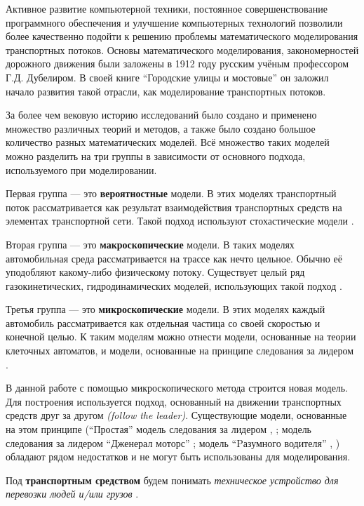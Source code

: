 \documentclass[12pt, a4paper]{extarticle}
\numberwithin{equation}{section}
\numberwithin{figure}{section}
\begin{document}
Активное развитие компьютерной техники, постоянное совершенствование программного обеспечения и улучшение компьютерных технологий позволили более качественно подойти к решению проблемы математического моделирования транспортных потоков. Основы математического моделирования, закономерностей дорожного движения были заложены в 1912 году русским учёным профессором Г.Д. Дубелиром. В своей книге ``Городские улицы и мостовые'' \cite{Street} он заложил начало развития такой отрасли, как моделирование транспортных потоков.

За более чем вековую историю исследований было создано и применено множество различных теорий и методов, а также было создано большое количество разных математических моделей. Всё множество таких моделей можно разделить на три группы в зависимости от основного подхода, используемого при моделировании.

Первая группа --- это \textbf{вероятностные} модели. В этих моделях транспортный поток рассматривается как результат взаимодействия транспортных средств на элементах транспортной сети.
Такой подход используют стохастические модели \cite{probabilistic_model}.

Вторая группа --- это \textbf{макроскопические} модели. В таких моделях автомобильная среда рассматривается на трассе как нечто цельное. Обычно её уподобляют какому-либо физическому потоку. Существует целый ряд газокинетических, гидродинамических моделей, использующих такой подход \cite{macro_model}.

Третья группа --- это \textbf{микроскопические} модели. В этих моделях каждый автомобиль рассматривается как отдельная частица со своей скоростью и конечной целью. К таким моделям можно отнести модели, основанные на теории клеточных автоматов, и модели, основанные на принципе следования за лидером \cite{micro_model}.

В данной работе с помощью микроскопического метода строится новая модель. Для построения используется подход, основанный на движении транспортных средств друг за другом {\it(follow the leader)}. Существующие модели, основанные на этом принципе (``Простая'' модель следования за лидером \cite{FirstFollowTheLeaderModel}, \cite{RefineFirstFollowTheLeaderModel}; модель следования за лидером ``Дженерал моторс'' \cite{GazisModel}; модель ``Pазумного водителя'' \cite{TreiberModel_1}, \cite{TreiberModel_2}) обладают рядом недостатков и не могут быть использованы для моделирования.

Под \textbf{транспортным средством} будем понимать {\it техническое устройство для перевозки людей и/или грузов} \cite{TrafficFlow}.
\end{document}
